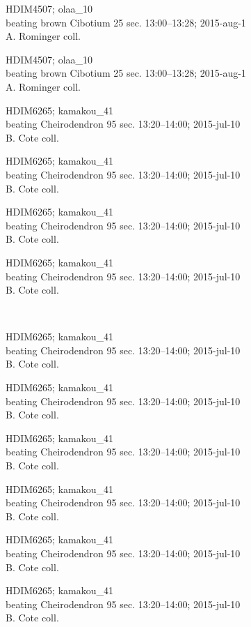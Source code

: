 \documentclass[2pt]{extarticle}
\begin{document}
\noindent
\parbox{0.16\textwidth}{\tiny \raggedright \rule[-0.3\baselineskip]{0pt}{10pt}HDIM4507; olaa\_10\\ beating brown Cibotium 25 sec. 13:00--13:28; 2015-aug-1\\ A. Rominger coll.}
\parbox{0.16\textwidth}{\tiny \raggedright \rule[-0.3\baselineskip]{0pt}{10pt}HDIM4507; olaa\_10\\ beating brown Cibotium 25 sec. 13:00--13:28; 2015-aug-1\\ A. Rominger coll.}
\parbox{0.16\textwidth}{\tiny \raggedright \rule[-0.3\baselineskip]{0pt}{10pt}HDIM6265; kamakou\_41\\ beating Cheirodendron 95 sec. 13:20--14:00; 2015-jul-10\\ B. Cote coll.}
\parbox{0.16\textwidth}{\tiny \raggedright \rule[-0.3\baselineskip]{0pt}{10pt}HDIM6265; kamakou\_41\\ beating Cheirodendron 95 sec. 13:20--14:00; 2015-jul-10\\ B. Cote coll.}
\parbox{0.16\textwidth}{\tiny \raggedright \rule[-0.3\baselineskip]{0pt}{10pt}HDIM6265; kamakou\_41\\ beating Cheirodendron 95 sec. 13:20--14:00; 2015-jul-10\\ B. Cote coll.}
\parbox{0.16\textwidth}{\tiny \raggedright \rule[-0.3\baselineskip]{0pt}{10pt}HDIM6265; kamakou\_41\\ beating Cheirodendron 95 sec. 13:20--14:00; 2015-jul-10\\ B. Cote coll.} \\ 
\vspace{0.001in} 

\noindent
\parbox{0.16\textwidth}{\tiny \raggedright \rule[-0.3\baselineskip]{0pt}{10pt}HDIM6265; kamakou\_41\\ beating Cheirodendron 95 sec. 13:20--14:00; 2015-jul-10\\ B. Cote coll.}
\parbox{0.16\textwidth}{\tiny \raggedright \rule[-0.3\baselineskip]{0pt}{10pt}HDIM6265; kamakou\_41\\ beating Cheirodendron 95 sec. 13:20--14:00; 2015-jul-10\\ B. Cote coll.}
\parbox{0.16\textwidth}{\tiny \raggedright \rule[-0.3\baselineskip]{0pt}{10pt}HDIM6265; kamakou\_41\\ beating Cheirodendron 95 sec. 13:20--14:00; 2015-jul-10\\ B. Cote coll.}
\parbox{0.16\textwidth}{\tiny \raggedright \rule[-0.3\baselineskip]{0pt}{10pt}HDIM6265; kamakou\_41\\ beating Cheirodendron 95 sec. 13:20--14:00; 2015-jul-10\\ B. Cote coll.}
\parbox{0.16\textwidth}{\tiny \raggedright \rule[-0.3\baselineskip]{0pt}{10pt}HDIM6265; kamakou\_41\\ beating Cheirodendron 95 sec. 13:20--14:00; 2015-jul-10\\ B. Cote coll.}
\parbox{0.16\textwidth}{\tiny \raggedright \rule[-0.3\baselineskip]{0pt}{10pt}HDIM6265; kamakou\_41\\ beating Cheirodendron 95 sec. 13:20--14:00; 2015-jul-10\\ B. Cote coll.} \\ 
\vspace{0.001in} 
\end{document}
